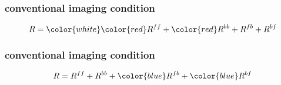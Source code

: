 \begin{frame} \frametitle{conventional imaging condition}
 \[
    R = {\color{white} \color{red} R^{ff}} + {\color{red} R^{bb}} + {R^{fb}}+ {R^{bf}}
 \]
\end{frame}

\begin{frame} \frametitle{conventional imaging condition}
 \[
    R = { R^{ff}} + {R^{bb}} + {\color{blue} R^{fb}}+ {\color{blue}R^{bf}}
 \]
\end{frame}


\begin{frame} 
\end{frame}



